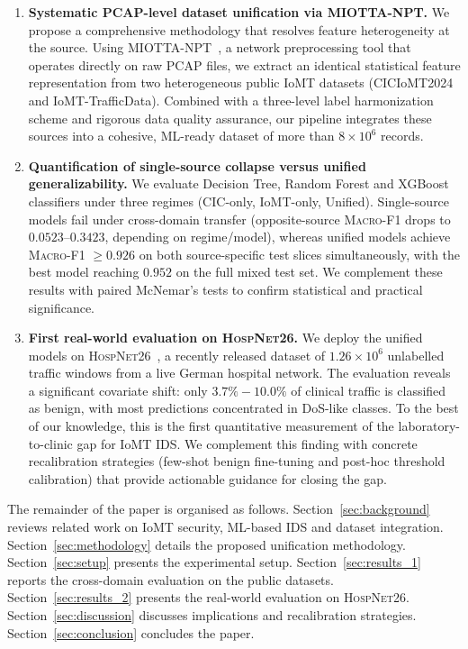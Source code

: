 \documentclass[runningheads]{llncs}
\newcommand{\macroF}{\textsc{Macro-F1}}
\begin{document}
\begin{enumerate}[nosep,leftmargin=*]
  \item \textbf{Systematic PCAP-level dataset unification via MIOTTA-NPT.} We propose a comprehensive methodology that resolves feature heterogeneity at the source. Using MIOTTA-NPT~\cite{leon2025miotta,miotta_npt_github}, a network preprocessing tool that operates directly on raw PCAP files, we extract an identical statistical feature representation from two heterogeneous public IoMT datasets (CICIoMT2024 and IoMT-TrafficData). Combined with a three-level label harmonization scheme and rigorous data quality assurance, our pipeline integrates these sources into a cohesive, ML-ready dataset of more than $8 \times 10^{6}$ records.

  \item \textbf{Quantification of single-source collapse versus unified generalizability.} We evaluate Decision Tree, Random Forest and XGBoost classifiers under three regimes (CIC-only, IoMT-only, Unified). Single-source models fail under cross-domain transfer (opposite-source \macroF{} drops to $0.0523$--$0.3423$, depending on regime/model), whereas unified models achieve \macroF{} $\geq 0.926$ on both source-specific test slices simultaneously, with the best model reaching $0.952$ on the full mixed test set. We complement these results with paired McNemar's tests to confirm statistical and practical significance.

  \item \textbf{First real-world evaluation on \textsc{HospNet26}.} We deploy the unified models on \textsc{HospNet26}~\cite{hospnet26,Domenech2026_cbms}, a recently released dataset of $1.26 \times 10^{6}$ unlabelled traffic windows from a live German hospital network. The evaluation reveals a significant covariate shift: only $3.7\%\!-\!10.0\%$ of clinical traffic is classified as benign, with most predictions concentrated in DoS-like classes. To the best of our knowledge, this is the first quantitative measurement of the laboratory-to-clinic gap for IoMT IDS. We complement this finding with concrete recalibration strategies (few-shot benign fine-tuning and post-hoc threshold calibration) that provide actionable guidance for closing the gap.
\end{enumerate}

The remainder of the paper is organised as follows. Section~\ref{sec:background} reviews related work on IoMT security, ML-based IDS and dataset integration. Section~\ref{sec:methodology} details the proposed unification methodology. Section~\ref{sec:setup} presents the experimental setup. Section~\ref{sec:results_1} reports the cross-domain evaluation on the public datasets. Section~\ref{sec:results_2} presents the real-world evaluation on \textsc{HospNet26}. Section~\ref{sec:discussion} discusses implications and recalibration strategies. Section~\ref{sec:conclusion} concludes the paper.
\end{document}
